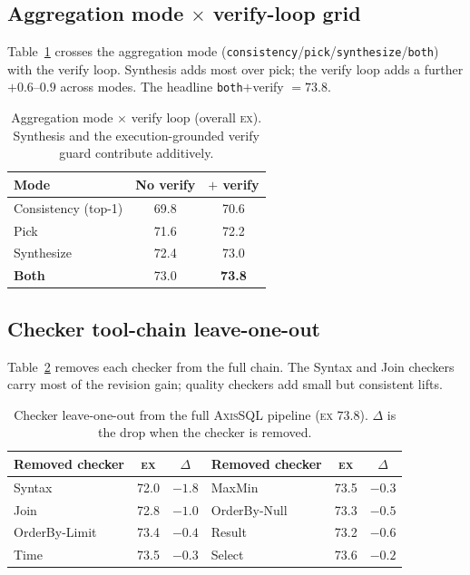 \documentclass{article}
\newcommand{\sys}{\textsc{AxisSQL}\xspace}
\newcommand{\ex}{\textsc{ex}\xspace}
\begin{document}
\subsection{Aggregation mode $\times$ verify-loop grid}
\label{app:mode}
Table~\ref{tab:s-mode} crosses the aggregation mode (\texttt{consistency}/\texttt{pick}/\texttt{synthesize}/\texttt{both}) with the verify loop. Synthesis adds most over pick; the verify loop adds a further $+0.6$--$0.9$ across modes. The headline \texttt{both}$+$verify $=73.8$.

\begin{table}[h]
\centering\small
\caption{Aggregation mode $\times$ verify loop (overall \ex). Synthesis and the execution-grounded verify guard contribute additively.}
\label{tab:s-mode}
\begin{tabular}{@{}lcc@{}}
\toprule
\textbf{Mode} & \textbf{No verify} & \textbf{$+$ verify} \\
\midrule
Consistency (top-1) & 69.8 & 70.6 \\
Pick                & 71.6 & 72.2 \\
Synthesize          & 72.4 & 73.0 \\
\textbf{Both}       & 73.0 & \textbf{73.8} \\
\bottomrule
\end{tabular}
\end{table}

\subsection{Checker tool-chain leave-one-out}
\label{app:checker}
Table~\ref{tab:s-checker} removes each checker from the full chain. The Syntax and Join checkers carry most of the revision gain; quality checkers add small but consistent lifts.

\begin{table}[h]
\centering\small
\caption{Checker leave-one-out from the full \sys{} pipeline (\ex{} $73.8$). $\Delta$ is the drop when the checker is removed.}
\label{tab:s-checker}
\begin{tabular}{@{}lcc|lcc@{}}
\toprule
\textbf{Removed checker} & \textbf{\ex} & $\Delta$ & \textbf{Removed checker} & \textbf{\ex} & $\Delta$ \\
\midrule
Syntax        & 72.0 & $-1.8$ & MaxMin       & 73.5 & $-0.3$ \\
Join          & 72.8 & $-1.0$ & OrderBy-Null & 73.3 & $-0.5$ \\
OrderBy-Limit & 73.4 & $-0.4$ & Result       & 73.2 & $-0.6$ \\
Time          & 73.5 & $-0.3$ & Select       & 73.6 & $-0.2$ \\
\bottomrule
\end{tabular}
\end{table}
\end{document}
